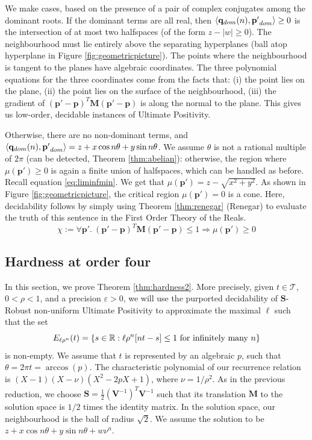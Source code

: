 We make cases, based on the presence of a pair of complex conjugates among the dominant roots. If the dominant terms are all real, then $\langle\mathbf{q}_{dom}(n), \mathbf{p'}_{dom}\rangle \ge 0$ is the intersection of at most two halfspaces (of the form $z - |w| \ge 0$). The neighbourhood must lie entirely above the separating hyperplanes (ball atop hyperplane in Figure \ref{fig:geometricpicture}). The points where the neighbourhood is tangent to the planes have algebraic coordinates. The three polynomial equations for the three coordinates come from the facts that: (i) the point lies on the plane, (ii) the point lies on the surface of the neighbourhood, (iii) the gradient of $(\mathbf{p'} - \mathbf{p})^T\mathbf{M}(\mathbf{p'} - \mathbf{p})$ is along the normal to the plane. This gives us low-order, decidable instances of Ultimate Positivity.

Otherwise, there are no non-dominant terms, and $\langle\mathbf{q}_{dom}(n), \mathbf{p'}_{dom}\rangle = z + x\cos n\theta + y\sin n\theta$. We assume $\theta$ is not a rational multiple of $2\pi$ (can be detected, Theorem \ref{thm:abelian}): otherwise, the region where $\mu(\mathbf{p'}) \ge 0$ is again a finite union of halfspaces, which can be handled as before. Recall equation \ref{eq:liminfmin}. We get that $\mu(\mathbf{p'}) = z -\sqrt{x^2 + y^2}$. As shown in Figure \ref{fig:geometricpicture}, the critical region $\mu(\mathbf{p'}) = 0$ is a cone. Here, decidability follows by simply using Theorem \ref{thm:renegar} (Renegar) to evaluate the truth of this sentence in the First Order Theory of the Reals.
\begin{equation}
\label{eq:firsttask}
\chi := \forall \mathbf{p'}.~ (\mathbf{p'} - \mathbf{p})^T\mathbf{M}(\mathbf{p'} - \mathbf{p}) \le 1 \Rightarrow \mu(\mathbf{p'}) \ge 0
\end{equation}

\subsection{Hardness at order four}
\label{section:hardness2}
In this section, we prove Theorem \ref{thm:hardness2}. More precisely, given $t \in \mathcal{T}$, $0 < \rho < 1$, and a precision $\varepsilon > 0$, we will use the purported decidability of $\mathbf{S}$-Robust non-uniform Ultimate Positivity to approximate the maximal $\ell$ such that the set 
$$
E_{\ell\rho^n}(t) = \{s\in \mathbb{R}: \ell\rho^n[nt - s] \le 1 \text{ for infinitely many } n\}
$$
is non-empty. We assume that $t$ is represented by an algebraic $p$, such that $\theta = 2\pi t = \arccos(p)$. The characteristic polynomial of our recurrence relation is $(X-1)(X-\nu)(X^2 - 2pX + 1)$, where $\nu = 1/\rho^2$. As in the previous reduction, we choose $\mathbf{S} = \frac{1}{2}(\mathbf{V}^{-1})^T\mathbf{V}^{-1}$ such that its translation $\mathbf{M}$ to the solution space is $1/2$ times the identity matrix. In the solution space, our neighbourhood is the ball of radius $\sqrt{2}$. We assume the solution to be $z + x\cos n\theta + y\sin n\theta + w\nu^n$.

